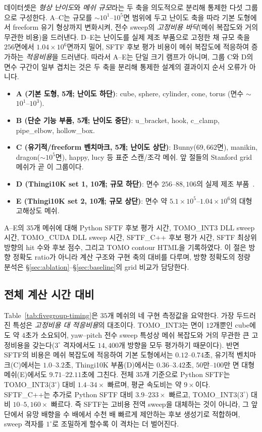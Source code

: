 \documentclass[11pt,a4paper]{article}
\begin{document}
데이터셋은 \emph{형상 난이도}와 \emph{메쉬 규모}라는 두 축을 의도적으로 분리해 통제한 다섯 그룹으로 구성한다.
A--C는 규모를 $\sim$$10^1$--$10^5$면 범위에 두고 난이도 축을 따라 기본 도형에서 freeform 유기 형상까지 변화시켜,
전수 sweep의 \emph{고정비용 바닥}(메쉬 복잡도와 거의 무관한 비용)을 드러낸다.
D--E는 난이도를 실제 제조 부품으로 고정한 채 규모 축을 $256$면에서 $1.04\times10^6$면까지 밀어,
SFTF 후보 평가 비용이 메쉬 복잡도에 적응하여 증가하는 \emph{적응비용}을 드러낸다.
따라서 A--E는 단일 크기 램프가 아니며, 그룹 C와 D의 면수 구간이 일부 겹치는 것은
두 축을 분리해 통제한 설계의 결과이지 순서 오류가 아니다.
\begin{itemize}
\item \textbf{A (기본 도형, 5개; 난이도 하단)}: cube, sphere, cylinder, cone, torus (면수 $\sim$$10^1$--$10^3$).
\item \textbf{B (단순 기능 부품, 5개; 난이도 중단)}: u\_bracket, hook, c\_clamp, pipe\_elbow, hollow\_box.
\item \textbf{C (유기적/freeform 벤치마크, 5개; 난이도 상단)}: Bunny($69{,}662$면), manikin, dragon($\sim$$10^5$면), happy, lucy 등 표준 스캔/조각 메쉬. 앞 절들의 Stanford grid 메쉬가 곧 이 그룹이다.
\item \textbf{D (Thingi10K set 1, 10개; 규모 하단)}: 면수 $256$--$88{,}106$의 실제 제조 부품~\cite{Thingi10K}.
\item \textbf{E (Thingi10K set 2, 10개; 규모 상단)}: 면수 약 $5.1\times10^5$--$1.04\times10^6$의 대형 고해상도 메쉬.
\end{itemize}
A--E의 $35$개 메쉬에 대해 Python SFTF 후보 평가 시간,
TOMO\_INT3 DLL sweep 시간, TOMO\_CUDA DLL sweep 시간, SFTF\_C++ 후보 평가 시간,
SFTF 최상위 방향의 hit 수와 후보 점수, 그리고 TOMO contour HTML을 기록하였다.
이 절은 방향 정확도 ratio가 아니라 계산 구조와 구현 축의 대비를 다루며,
방향 정확도의 정량 분석은 \S\ref{sec:ablation}--\S\ref{sec:baseline}의 grid 비교가 담당한다.

\subsection{전체 계산 시간 대비}

Table~\ref{tab:fivegroup-timing}은 $35$개 메쉬의 네 구현 측정값을 요약한다.
가장 두드러진 특성은 \emph{고정비용 대 적응비용}의 대조이다.
TOMO\_INT3는 면이 $12$개뿐인 cube에도 약 $4$초가 소요되어,
yaw--pitch 전수 sweep 특성상 메쉬 복잡도와 거의 무관한 큰 고정비용을 갖는다($3^\circ$ 격자에서도 $14{,}400$개 방향을 모두 평가하기 때문이다).
반면 SFTF의 비용은 메쉬 복잡도에 적응하여
기본 도형에서는 $0.12$--$0.74$초, 유기적 벤치마크(C)에서는 $1.0$--$3.2$초,
Thingi10K 부품(D)에서는 $0.36$--$3.42$초, $50$만--$100$만 면 대형 메쉬(E)에서도 $9.71$--$22.11$초에 그친다.
전체 $35$개 기준으로 Python SFTF는 TOMO\_INT3($3^\circ$) 대비 $1.4$--$34\times$ 빠르며,
평균 속도비는 약 $9\times$이다.
SFTF\_C++는 추가로 Python SFTF 대비 $3.9$--$233\times$ 빠르고,
TOMO\_INT3($3^\circ$) 대비 $10$--$5{,}160\times$ 빠르다.
즉 SFTF는 고비용 전역 sweep을 대체하는 것이 아니라,
그 앞단에서 유망 배향을 수 배에서 수천 배 빠르게 제안하는 후보 생성기로 적합하며,
sweep 격자를 $1^\circ$로 조밀하게 할수록 이 격차는 더 벌어진다.
\end{document}
